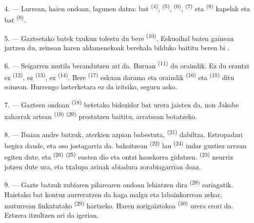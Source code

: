 4. --- Lurrean, haien ondoan, lagunen  datza: 
 bat \textsuperscript{(4)}, 
\textsuperscript{(5)},  \textsuperscript{(6)},
 \textsuperscript{(7)} eta 
\textsuperscript{(8)} kapelak eta  bat \textsuperscript{(9)}.

5. --- Gazteetako batek txukun tolestu du bere 
\textsuperscript{(10)}. Eskuoihal baten gainean jartzen du, zeinean haren
aldamenekoak berehala bilduko baititu beren bi .

6. --- Seigarren mutila berandutzen ari da. Buruan 
\textsuperscript{(11)} du oraindik. Ez du erantzi ez 
\textsuperscript{(12)}, ez  \textsuperscript{(13)}, ez
 \textsuperscript{(14)}. Bere 
\textsuperscript{(17)} eskuan darama eta oraindik 
\textsuperscript{(16)} eta  \textsuperscript{(15)} ditu soinean.
Hurrengo lasterketara ez da iritsiko, seguru asko.

7. --- Gazteen ondoan  \textsuperscript{(18)} betetako bidezidor
bat urera jaisten da, non Jakobe zaharrak  artean
\textsuperscript{(19)}  \textsuperscript{(20)} prestatzen
baititu, arratsean botatzeko.

\VUsaut{4.4mm}
\VUsaut{3.4mm}

8. --- Ibaian andre batzuk, aterkien azpian babestuta, 
\textsuperscript{(21)} dabiltza. Estropadari begira daude, eta oso jostagarria da.
 bakoitzean \textsuperscript{(22)} lau 
\textsuperscript{(24)} indar guztiez arraun egiten dute, eta 
\textsuperscript{(26)}  \textsuperscript{(25)} eusten dio eta
ontzi hauskorra gidatzen.  \textsuperscript{(23)} neurriz jotzen
dute ura, eta txalupa arinak abiadura zorabiagarrian doaz.

9. --- Gazte batzuk zubiaren pilarearen ondoan lehiatzen dira  \textsuperscript{(28)} sariagatik. Haietako bat kontuz aurreratzen da
haga malgu eta labainkorrean zehar, muturrean finkatutako 
\textsuperscript{(29)} hartzeko. Haren  zorigaiztokoa
\textsuperscript{(30)} urera erori da. Ertzera itzultzen ari da igerian.

